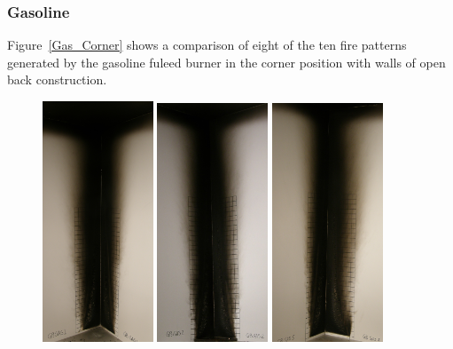 \documentclass[twoside]{uocthesis}
\begin{document}
\subsubsection{Gasoline}

Figure~\ref{Gas_Corner} shows a comparison of eight of the ten fire patterns generated by the gasoline fuleed burner in the corner position with walls of open back construction. 

\begin{figure}[p]
	\includegraphics[width=1.3in]{../Figures/GBGas1C_P5270387}
	\includegraphics[width=1.3in]{../Figures/GBGas2C_P5270454}
	\includegraphics[width=1.3in]{../Figures/GBGas5C_P5270493}

\end{figure}
\end{document}
